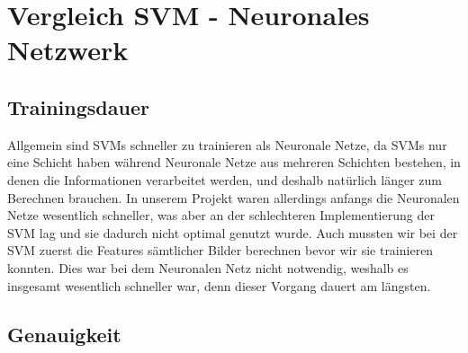 \section{Vergleich SVM - Neuronales Netzwerk}

\subsection{Trainingsdauer}

Allgemein sind SVMs schneller zu trainieren als Neuronale Netze, da SVMs nur eine Schicht haben während Neuronale Netze aus mehreren Schichten bestehen, in denen die Informationen verarbeitet werden, und deshalb natürlich länger zum Berechnen brauchen. In unserem Projekt waren allerdings anfangs die Neuronalen Netze wesentlich schneller, was aber an der schlechteren Implementierung der SVM lag und sie dadurch nicht optimal genutzt wurde. Auch mussten wir bei der SVM zuerst die Features sämtlicher Bilder berechnen bevor wir sie trainieren konnten. Dies war bei dem Neuronalen Netz nicht notwendig, weshalb es insgesamt wesentlich schneller war, denn dieser Vorgang dauert am längsten.

\subsection{Genauigkeit}
